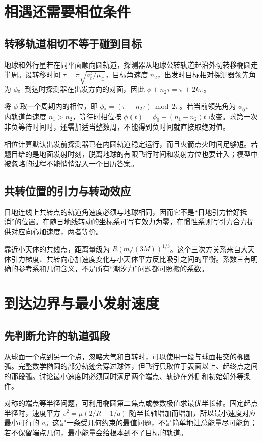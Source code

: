 \section{相遇还需要相位条件}
\subsection{转移轨道相切不等于碰到目标}

地球和外行星若在同平面顺向圆轨道，探测器从地球公转轨道起沿外切转移椭圆走半周。设转移时间 $\tau=\pi\sqrt{a_t^3/\mu_\odot}$，目标角速度 $n_2$，出发时目标相对探测器领先角为 $\phi$。到达时探测器在出发方向的对面，因此 $\phi+n_2\tau=\pi+2k\pi$。

将 $\phi$ 取一个周期内的相位，即 $\phi_*=(\pi-n_2\tau)\bmod2\pi$。若当前领先角为 $\phi_0$、内轨道角速度 $n_1>n_2$，等待时相位按 $\phi(t)=\phi_0-(n_1-n_2)t$ 改变。求第一次非负等待时间时，还需加适当整数周，不能得到负时间就直接取绝对值。

相位计算默认出发前探测器已在内圆轨道稳定运行，而且火箭点火时间足够短。若题目给的是地面发射时刻，脱离地球的有限飞行时间和发射方位也要计入；模型中被忽略的过程不能悄悄混入一个日历答案。

\subsection{共转位置的引力与转动效应}

日地连线上共转点的轨道角速度必须与地球相同，因而它不是“日地引力恰好抵消”的位置。在随日地线转动的坐标系可写有效力为零，在惯性系则写引力合力提供对应向心加速度，两者等价。

靠近小天体的共线点，距离量级为 $R(m/(3M))^{1/3}$。这个三次方关系来自大天体引力梯度、共转向心加速度变化与小天体平方反比吸引之间的平衡。系数三有明确的参考系和几何含义，不是所有“潮汐力”问题都可照搬的系数。


\section{到达边界与最小发射速度}
\subsection{先判断允许的轨道弧段}

从球面一个点到另一个点，忽略大气和自转时，可以使用一段与球面相交的椭圆弧。完整数学椭圆的部分轨迹会穿过球体，但飞行只取位于表面以上、起终点之间的那段弧。讨论最小速度时必须同时满足两个端点、轨迹在外侧和初始朝外等条件。

对称的端点等半径问题，可利用椭圆第二焦点或参数极值求最优半长轴。固定起点半径时，速度平方 $v^2=\mu(2/R-1/a)$ 随半长轴增加而增加，所以最小速度对应最小可行的 $a$。这是一条受几何约束的最值问题，不是简单地让总能量尽可能负；若不保留端点几何，最小能量会给根本到不了目标的轨道。

